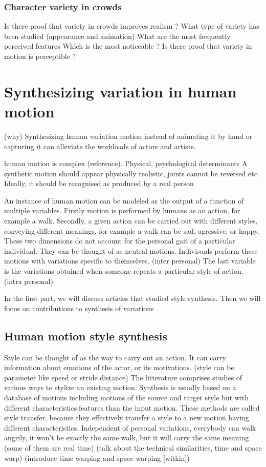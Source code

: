 \documentclass[11pt]{sdm_internship}
\begin{document}
\subsubsection{Character variety in crowds}{
Is there proof that variety in crowds improves realism ?
What type of variety has been studied (appearance and animation)
What are the most frequently perceived features
Which is the most noticeable ?
Is there proof that variety in motion is perceptible ?

\section{Synthesizing variation in human motion}

(why)
Synthesizing human variation motion instead of animating it by hand or capturing it can alleviate the workloads of actors and artists.

human motion is complex (reference). Physical, psychological determinants
A synthetic motion should appear physically realistic, joints cannot be reversed etc.
Ideally, it should be recognised as produced by a real person

An instance of human motion can be modeled as the output of a function of multiple variables.
Firstly motion is performed by humans as an action, for example a walk.
Secondly, a given action can be carried out with different styles, conveying different meanings, for example a walk can be sad, agressive, or happy.
These two dimensions do not account for the personal gait of a particular individual. They can be thought of as neutral motions. 
Indivisuals perform these motions with variations specific to themselves. (inter personal)
The last variable is the variations obtained when someone repeats a particular style of action. (intra personal)

In the first part, we will discuss articles that studied style synthesis. Then we will focus on contributions to synthesis of variations

\subsection{Human motion style synthesis}

Style can be thought of as the way to carry out an action. It can carry information about emotions of the actor, or its motivations.
(style can be parameter like speed or stride distance)
The litterature comprises studies of various ways to stylize an existing motion. Synthesis is usually based on a database of motions including motions of the source and target style but with different characteristics|features than the input motion.
These methods are called style transfer, because they effectively transfer a style to a new motion having different characteristics. 
Independent of personal variations, everybody can walk angrily, it won't be exactly the same walk, but it will carry the same meaning
(some of them are real time)
(talk about the technical similarities, time and space warp)
(introduce time warping and space warping [witkin])

}
\end{document}
